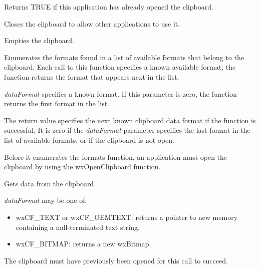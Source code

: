 Returns TRUE if this application has already opened the clipboard.



Closes the clipboard to allow other applications to use it.



Empties the clipboard.



Enumerates the formats found in a list of available formats that belong
to the clipboard. Each call to this  function specifies a known
available format; the function returns the format that appears next in
the list. 

{\it dataFormat} specifies a known format. If this parameter is zero,
the function returns the first format in the list. 

The return value specifies the next known clipboard data format if the
function is successful. It is zero if the {\it dataFormat} parameter specifies
the last  format in the list of available formats, or if the clipboard
is not open. 

Before it enumerates the formats function, an application must open the clipboard by using the 
wxOpenClipboard function. 



Gets data from the clipboard.

{\it dataFormat} may be one of:

\begin{itemize}\itemsep=0pt
\item wxCF\_TEXT or wxCF\_OEMTEXT: returns a pointer to new memory containing a null-terminated text string.
\item wxCF\_BITMAP: returns a new wxBitmap.
\end{itemize}

The clipboard must have previously been opened for this call to succeed.



